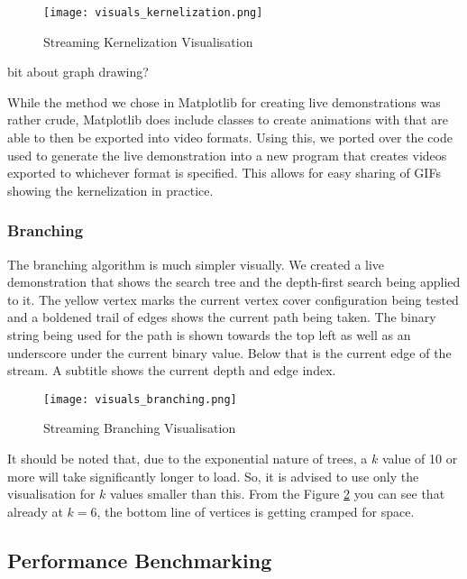 \begin{figure}[htb]
    \centering
    \texttt{[image: visuals\_kernelization.png]}
    \caption{Streaming Kernelization Visualisation}
    \label{fig:kernelization_visualisation}
\end{figure}

bit about graph drawing?

While the method we chose in Matplotlib for creating live demonstrations
was rather crude, Matplotlib does include classes to create animations
with that are able to then be exported into video formats. Using this,
we ported over the code used to generate the live demonstration into a
new program that creates videos exported to whichever format is
specified. This allows for easy sharing of GIFs showing the
kernelization in practice.

\subsubsection{Branching}

The branching algorithm is much simpler visually. We created a live
demonstration that shows the search tree and the depth-first search
being applied to it. The yellow vertex marks the current vertex cover
configuration being tested and a boldened trail of edges shows the
current path being taken. The binary string being used for the path is
shown towards the top left as well as an underscore under the current
binary value. Below that is the current edge of the stream. A subtitle
shows the current depth and edge index.

\begin{figure}[htb]
    \centering
    \texttt{[image: visuals\_branching.png]}
    \caption{Streaming Branching Visualisation}
    \label{fig:branching_visualisation}
\end{figure}

It should be noted that, due to the exponential nature of trees, a \(k\)
value of 10 or more will take significantly longer to load. So, it is
advised to use only the visualisation for \(k\) values smaller than
this. From the Figure \ref{fig:branching_visualisation} you can see that already at \(k=6\), the
bottom line of vertices is getting cramped for space.

\subsection{Performance Benchmarking}

